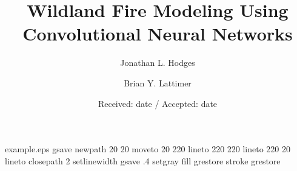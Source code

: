 %
%
%
%
%
\begin{filecontents*}{example.eps}
gsave
newpath
  20 20 moveto
  20 220 lineto
  220 220 lineto
  220 20 lineto
closepath
2 setlinewidth
gsave
  .4 setgray fill
grestore
stroke
grestore
\end{filecontents*}
%
\RequirePackage{fix-cm}
%
\documentclass[twocolumn]{svjour3}          %
%
\smartqed  %
%
\usepackage{graphicx}
\newcommand{\etal}{\textit{et al}. }



\title{Wildland Fire Modeling Using Convolutional Neural Networks
}

\author{Jonathan L. Hodges         \and
        Brian Y. Lattimer
}


\date{Received: date / Accepted: date}


\maketitle

